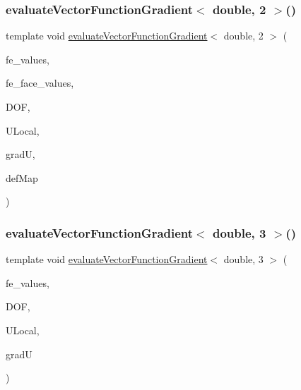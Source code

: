 \mbox{\label{function_evaluations_8cc_a60c8d8f11fc75f1a2d1775dd5ea95d79}} 
\subsubsection{\texorpdfstring{evaluate\+Vector\+Function\+Gradient$<$ double, 2 $>$()}{evaluateVectorFunctionGradient< double, 2 >()}\hspace{0.1cm}{\footnotesize\ttfamily [4/4]}}
{\footnotesize\ttfamily template void \mbox{\hyperlink{group___evaluation_functions_ga9608539d601a91aff1ba01ccc720fbe0}{evaluate\+Vector\+Function\+Gradient}}$<$ double, 2 $>$ (\begin{DoxyParamCaption}\item[{const F\+E\+Values$<$ 2 $>$ \&}]{fe\+\_\+values,  }\item[{const F\+E\+Face\+Values$<$ 2 $>$ \&}]{fe\+\_\+face\+\_\+values,  }\item[{unsigned int}]{D\+OF,  }\item[{Table$<$ 1, double $>$ \&}]{U\+Local,  }\item[{Table$<$ 3, double $>$ \&}]{gradU,  }\item[{\mbox{\hyperlink{structdeformation_map}{deformation\+Map}}$<$ double, 2 $>$ \&}]{def\+Map }\end{DoxyParamCaption})}

\mbox{\label{function_evaluations_8cc_aae302a9653e837488a7c5989cff31c04}} 
\subsubsection{\texorpdfstring{evaluate\+Vector\+Function\+Gradient$<$ double, 3 $>$()}{evaluateVectorFunctionGradient< double, 3 >()}\hspace{0.1cm}{\footnotesize\ttfamily [1/4]}}
{\footnotesize\ttfamily template void \mbox{\hyperlink{group___evaluation_functions_ga9608539d601a91aff1ba01ccc720fbe0}{evaluate\+Vector\+Function\+Gradient}}$<$ double, 3 $>$ (\begin{DoxyParamCaption}\item[{const F\+E\+Values$<$ 3 $>$ \&}]{fe\+\_\+values,  }\item[{unsigned int}]{D\+OF,  }\item[{Table$<$ 1, double $>$ \&}]{U\+Local,  }\item[{Table$<$ 3, double $>$ \&}]{gradU }\end{DoxyParamCaption})}

